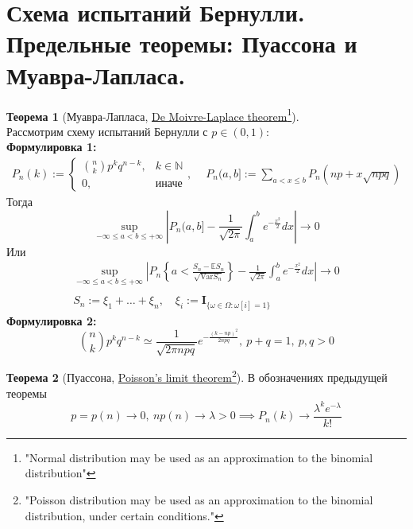 \documentclass[11pt,a4paper]{report}
\def\E{\mathbb{E}}
\def\Var{\mathrm{Var}}
\def\Natural{\mathbb{N}}
\theoremstyle{definition}
\theoremstyle{definition}
\newtheorem{theorem}{Теорема}[section]
\theoremstyle{definition}
\begin{document}
	\section{Схема испытаний Бернулли. Предельные теоремы: Пуассона и Муавра-Лапласа.}
	\begin{theorem}[Муавра-Лапласа, \href{https://goo.gl/azXZGx}{De Moivre-Laplace theorem}\footnote{"Normal distribution may be used as an approximation to the binomial distribution"}]$  $\\
		Рассмотрим схему испытаний Бернулли с $ p \in (0, 1) $:\\
		\textbf{Формулировка 1:}\\
		\begin{gather*}
			P_{n}(k) := \begin{cases} 
					{{n}\choose{k}} p^{k} q^{n-k}, & k \in \Natural\\
					0, & \text{иначе}
				\end{cases},\quad
			\ P_{n}(a, b] := \sum\limits_{a < x \le b} P_{n}(np + x\sqrt{npq})
		\end{gather*}
		Тогда 
		\[ \sup\limits_{-\infty \le a < b \le +\infty }  \left| P_{n}(a, b] - \frac{1}{\sqrt{2\pi}} \int_{a}^{b} e^{-\frac{x^{2}}{2}} dx \right| \to 0 \]
		Или 
		\begin{gather*} 
			\sup\limits_{-\infty \le a < b \le +\infty }  \left| P_{n}\left\{ a < \frac{S_{n} - \E S_{n}}{\sqrt{\Var S_{n}}} \right\} - \frac{1}{\sqrt{2\pi}} \int_{a}^{b} e^{-\frac{x^{2}}{2}} dx \right| \to 0\\
			\\
			S_{n} := \xi_{1} + \dots + \xi_{n},\quad \xi_{i} := \mathbf{I}_{\{ \omega \in \Omega: \omega[i] = 1 \}}
		\end{gather*}
		\textbf{Формулировка 2:}\\
		\[ {{n}\choose{k}} p^{k} q^{n-k} \simeq \frac{1}{\sqrt{2 \pi npq}} e^{-\frac{(k - np)^{2}}{2npq}},\ p + q = 1,\ p, q > 0  \]
	\end{theorem}
	\begin{theorem}[Пуассона, \href{https://goo.gl/V5aRg3}{Poisson's limit theorem}\footnote{"Poisson distribution may be used as an approximation to the binomial distribution, under certain conditions."}]
		В обозначениях предыдущей теоремы
		\[
			p = p(n) \to 0,\ n p(n) \to \lambda > 0 \implies P_{n}(k) \to \frac{\lambda^{k} e^{-\lambda}}{k!}
		\]
	\end{theorem}
\end{document}

